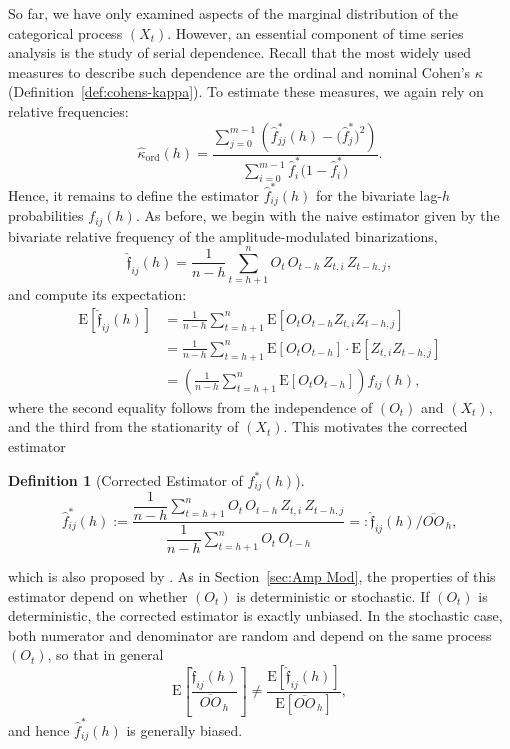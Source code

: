﻿\documentclass[12pt,a4paper]{scrreprt}
\theoremstyle{definition}
\newtheorem{definition}[theorem]{Definition}
\begin{document}
So far, we have only examined aspects of the marginal distribution of 
the categorical process $(X_t)$. However, an essential component of 
time series analysis is the study of serial dependence. Recall that 
the most widely used measures to describe such dependence are the 
ordinal and nominal Cohen's $\kappa$ (Definition~\ref{def:cohens-kappa}). 
To estimate these measures, we again rely on relative frequencies:
\[
    \hat{\kappa}_{\mathrm{ord}}(h) 
    = \frac{\sum_{j=0}^{m-1}\left(\hat{f}_{jj}^*(h) 
    - \bigl(\hat{f}^*_j\bigr)^2\right)}{\sum_{i=0}^{m-1}
    \hat{f}^*_i\bigl(1-\hat{f}_i^*\bigr)}.
\]
Hence, it remains to define the estimator $\hat{f}^*_{ij}(h)$ for the 
bivariate lag-$h$ probabilities $f_{ij}(h)$. As before, we begin with 
the naive estimator given by the bivariate relative frequency of the 
amplitude-modulated binarizations,
\[
    \hat{\mathfrak{f}}_{ij}(h) 
    = \frac{1}{n-h}\sum_{t=h+1}^{n} O_t\, O_{t-h}\, Z_{t,i}\, Z_{t-h,j},
\]
and compute its expectation:
\begin{align*}
    \mathrm{E}\!\left[\hat{\mathfrak{f}}_{ij}(h)\right]
    &= \frac{1}{n-h}\sum_{t=h+1}^{n}
       \mathrm{E}\!\left[O_t O_{t-h} Z_{t,i} Z_{t-h,j}\right] \\
    &= \frac{1}{n-h}\sum_{t=h+1}^{n}
       \mathrm{E}\!\left[O_t O_{t-h}\right] \cdot 
       \mathrm{E}\!\left[Z_{t,i} Z_{t-h,j}\right] \\
    &= \left(\frac{1}{n-h}\sum_{t=h+1}^{n}
       \mathrm{E}\!\left[O_t O_{t-h}\right]\right) f_{ij}(h),
\end{align*}
where the second equality follows from the independence of $(O_t)$ 
and $(X_t)$, and the third from the stationarity of $(X_t)$. This 
motivates the corrected estimator

\begin{definition}[Corrected Estimator of $f^*_{ij}(h)$]\label{def:biv_probs_est}
\[
    \hat{f}^*_{ij}(h)
    := \frac{\dfrac{1}{n-h}\displaystyle\sum_{t=h+1}^{n} 
      O_t\, O_{t-h}\, Z_{t,i}\, Z_{t-h,j}}
      {\dfrac{1}{n-h}\displaystyle\sum_{t=h+1}^{n} O_t\, O_{t-h}}
    =: \hat{\mathfrak{f}}_{ij}(h) \big/ \overline{OO}_{\,h}, \label{def:biv_probs_est}
\]\end{definition}\noindent
which is also proposed by \citet[p.~4683]{weiss2021categorical}. As in Section~\ref{sec:Amp Mod}, the properties of this estimator 
depend on whether $(O_t)$ is deterministic or stochastic. If $(O_t)$ 
is deterministic, the corrected estimator is exactly unbiased. In the 
stochastic case, both numerator and denominator are random and depend 
on the same process $(O_t)$, so that in general
\[
    \mathrm{E}\!\left[\frac{\hat{\mathfrak{f}}_{ij}(h)}
    {\overline{OO}_{\,h}}\right] \neq 
    \frac{\mathrm{E}\!\left[\hat{\mathfrak{f}}_{ij}(h)\right]}
    {\mathrm{E}\!\left[\overline{OO}_{\,h}\right]},
\]
and hence $\hat{f}^*_{ij}(h)$ is generally biased.
\end{document}
